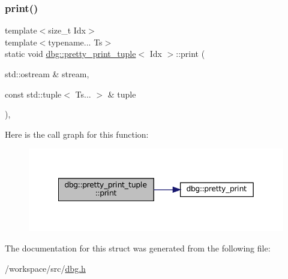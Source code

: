 \subsubsection{\texorpdfstring{print()}{print()}}
{\footnotesize\ttfamily template$<$size\+\_\+t Idx$>$ \\
template$<$typename... Ts$>$ \\
static void \hyperlink{structdbg_1_1pretty__print__tuple}{dbg\+::pretty\+\_\+print\+\_\+tuple}$<$ Idx $>$\+::print (\begin{DoxyParamCaption}\item[{std\+::ostream \&}]{stream,  }\item[{const std\+::tuple$<$ Ts... $>$ \&}]{tuple }\end{DoxyParamCaption})\hspace{0.3cm}{\ttfamily [inline]}, {\ttfamily [static]}}

Here is the call graph for this function\+:
\nopagebreak
\begin{figure}[H]
\begin{center}
\leavevmode
\includegraphics[width=342pt]{structdbg_1_1pretty__print__tuple_a17c2bca6c330e88da2082efa4c3a9be5_cgraph}
\end{center}
\end{figure}


The documentation for this struct was generated from the following file\+:\begin{DoxyCompactItemize}
\item 
/workspace/src/\hyperlink{dbg_8h}{dbg.\+h}\end{DoxyCompactItemize}
